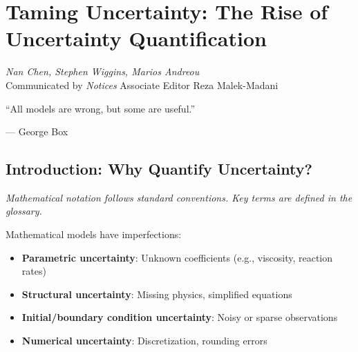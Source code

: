 \chapter{Taming Uncertainty: The Rise of Uncertainty Quantification}
\label{ch:uq}

\begin{flushright}
\textit{Nan Chen, Stephen Wiggins, Marios Andreou}\\
Communicated by \textit{Notices} Associate Editor Reza Malek-Madani
\end{flushright}

\epigraph{``All models are wrong, but some are useful.''}{--- George Box}

\begin{abstract}
Uncertainty Quantification (UQ) provides a systematic framework for characterizing how unknowns propagate through mathematical models. This chapter is a self-contained tutorial: from Shannon entropy and KL divergence through data assimilation (Kalman/Ensemble filters) to stochastic surrogate modeling for turbulent PDEs. Complete with MATLAB/Python code for every algorithm, \cite{chen2025uq}.
\end{abstract}

\section{Introduction: Why Quantify Uncertainty?}

\noindent\textit{Mathematical notation follows standard conventions. Key terms are defined in the glossary.}\n
\label{sec:uq:intro}

Mathematical models have imperfections:
\begin{itemize}
    \item \textbf{Parametric uncertainty}: Unknown coefficients (e.g., viscosity, reaction rates) \cite{chen2025uq}
    \item \textbf{Structural uncertainty}: Missing physics, simplified equations \cite{chen2025uq}
    \item \textbf{Initial/boundary condition uncertainty}: Noisy or sparse observations \cite{chen2025uq}
    \item \textbf{Numerical uncertainty}: Discretization, rounding errors \cite{chen2025uq}
\end{itemize}

